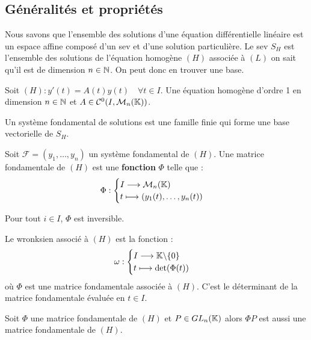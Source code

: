 \subsection{Généralités et propriétés} 

Nous savons que l'ensemble des solutions d'une équation différentielle linéaire est un 
espace affine composé d'un sev et d'une solution particulière. 
Le sev $S_H$ est l'ensemble des solutions de l'équation homogène $(H)$ associée à $(L)$ 
on sait qu'il est de dimension $n \in \mathbb{N}$. On peut donc en trouver une base. 

\vspace{0.3cm}

Soit $(H) : y'(t) = A(t) y(t) \quad \forall t \in I$. Une équation homogène d'ordre 1
en dimension $n \in  \mathbb{N}$ et $A \in \mathcal{C}^0(I, \mathcal{M}_n(\mathbb{K}))$.   

\begin{definition}
	Un système fondamental de solutions est une famille finie qui forme une base 
	vectorielle de $S_H$. 
\end{definition} 

\begin{definition}
	Soit $ \mathcal{F} = (y_1, \dots, y_n)$ un système fondamental de $(H)$. 
	Une matrice fondamentale de $(H)$ est une \textbf{fonction} $\Phi$ telle que : 
		\[ \Phi : 
			\begin{cases}
				I \longrightarrow \mathcal{M}_n(\mathbb{K}) \\ 
				t \longmapsto (y_1(t), \dots, y_n(t))
			\end{cases}  \]	
\end{definition} 

\begin{remark}
	Pour tout $ i \in  I$, $\Phi$ est inversible. 
\end{remark} 

\begin{definition}[Wronksien]
	Le wronksien associé à $(H)$ est la fonction : 
		\[ \omega : 
			\begin{cases}
				I \longrightarrow \mathbb{K} \backslash \{0\} \\ 
				t \longmapsto \det (\Phi(t))
			\end{cases} \]
	où $\Phi$ est une matrice fondamentale associée à $(H)$.
	C'est le déterminant de la matrice fondamentale évaluée en $t \in  I$. 
\end{definition} 

\begin{remark} 
	Soit $\Phi$ une matrice fondamentale de $(H)$ et $P \in  GL_n(\mathbb{K})$ alors $\Phi P$ est aussi 
	une matrice fondamentale de $(H)$. 
\end{remark} 

